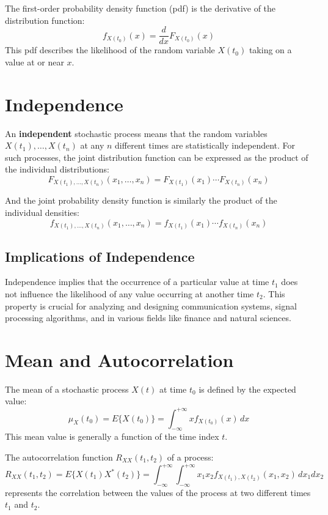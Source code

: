 The first-order probability density function (pdf) is the derivative of the distribution function:
\[ f_{X(t_0)}(x) = \frac{d}{dx}F_{X(t_0)}(x) \]
This pdf describes the likelihood of the random variable \( X(t_0) \) taking on a value at or near \( x \).

\section*{Independence}

An \textbf{independent} stochastic process means that the random variables \( X(t_1), \ldots, X(t_n) \) at any \( n \) different times are statistically independent. For such processes, the joint distribution function can be expressed as the product of the individual distributions:
\[ F_{X(t_1),\ldots,X(t_n)}(x_1, \ldots, x_n) = F_{X(t_1)}(x_1) \cdots F_{X(t_n)}(x_n) \]

And the joint probability density function is similarly the product of the individual densities:
\[ f_{X(t_1),\ldots,X(t_n)}(x_1, \ldots, x_n) = f_{X(t_1)}(x_1) \cdots f_{X(t_n)}(x_n) \]

\subsection*{Implications of Independence}

Independence implies that the occurrence of a particular value at time \( t_1 \) does not influence the likelihood of any value occurring at another time \( t_2 \). This property is crucial for analyzing and designing communication systems, signal processing algorithms, and in various fields like finance and natural sciences.


\section*{Mean and Autocorrelation}

The mean of a stochastic process \( X(t) \) at time \( t_0 \) is defined by the expected value:
\[ \mu_X(t_0) = E\{X(t_0)\} = \int_{-\infty}^{+\infty} x f_{X(t_0)}(x) \, dx \]
This mean value is generally a function of the time index \( t \).

The autocorrelation function \( R_{XX}(t_1, t_2) \) of a process:
\[ R_{XX}(t_1, t_2) = E\{X(t_1)X^*(t_2)\} = \int_{-\infty}^{+\infty} \int_{-\infty}^{+\infty} x_1 x_2 f_{X(t_1),X(t_2)}(x_1, x_2) \, dx_1 dx_2 \]
represents the correlation between the values of the process at two different times \( t_1 \) and \( t_2 \).

